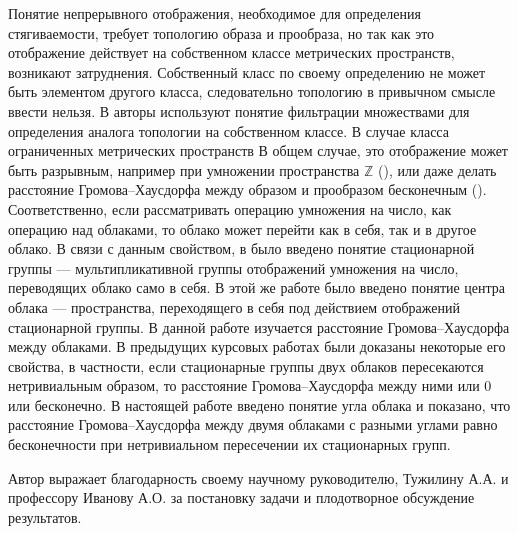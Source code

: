 Понятие непрерывного отображения, необходимое для определения стягиваемости,
требует топологию образа и прообраза, но так как это отображение действует на
собственном классе метрических пространств, возникают затруднения. Собственный
класс по своему определению не может быть элементом другого класса,
следовательно топологию в привычном смысле ввести нельзя. В
\cite{borzov_extendability_2020} авторы используют понятие фильтрации
множествами для определения аналога топологии на собственном классе.
В случае класса ограниченных метрических пространств В общем случае, это
отображение может быть разрывным, например при умножении пространства \(
\mathbb{Z} \) (\cite{mikhailov2025newgeodesiclinesgromovhausdorff}), или даже
делать расстояние Громова--Хаусдорфа между образом и прообразом бесконечным
(\cite{TuzhBog1}). Соответственно, если рассматривать операцию умножения на
число, как операцию над облаками, то облако может перейти как в себя, так и в
другое облако. В связи с данным свойством, в \cite{TuzhBog2} было введено
понятие стационарной группы --- мультипликативной группы отображений умножения
на число, переводящих облако само в себя. В этой же работе было введено понятие
центра облака --- пространства, переходящего в себя под действием отображений
стационарной группы.
В данной работе изучается расстояние Громова--Хаусдорфа между облаками. В
предыдущих курсовых работах были доказаны некоторые его свойства, в
частности, если
стационарные группы двух облаков пересекаются нетривиальным образом, то
расстояние Громова--Хаусдорфа между ними или \( 0 \) или бесконечно. В
настоящей работе введено понятие угла облака и показано, что расстояние
Громова--Хаусдорфа между двумя облаками с разными углами равно бесконечности
при нетривиальном пересечении их стационарных групп.

Автор выражает благодарность своему научному руководителю, Тужилину А.А. и
профессору Иванову А.О. за постановку задачи и плодотворное обсуждение
результатов.
